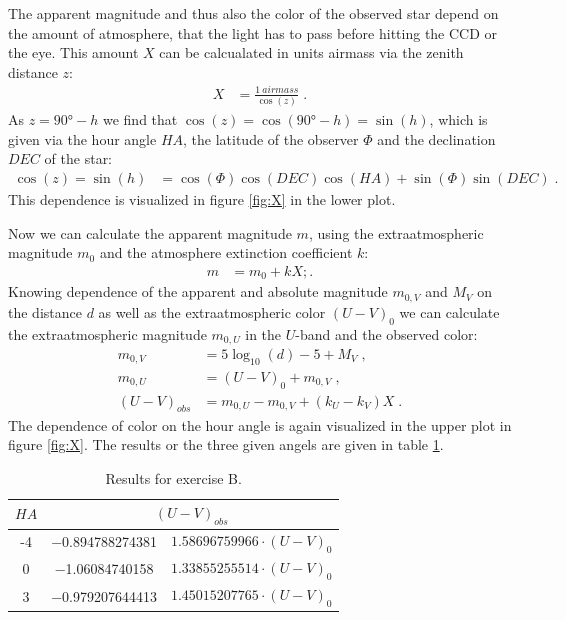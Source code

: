 \documentclass[11pt,a4paper,twoside]{article}
\begin{document}
The apparent magnitude and thus also the color of the observed star depend on
the amount of atmosphere, that the light has to pass before hitting the 
CCD or the eye. This amount $X$ can be calcualated in units airmass via the 
zenith distance $z$:
\begin{align}
    X &= \frac{\SI{1}{airmass}}{\cos(z)} \;.
\end{align}
As $z = \ang{90} - h$ we find that $\cos(z) = \cos(\ang{90} - h) = \sin(h)$,
which is given via the hour angle $HA$, the latitude of the observer $\Phi$
and the declination $DEC$ of the star:
\begin{align}
    \cos(z) = \sin(h) &= \cos(\Phi)\cos(DEC)\cos(HA) + \sin(\Phi)\sin(DEC) \;.
\end{align}
This dependence is visualized in figure \ref{fig:X} in the lower plot.

Now we can calculate the apparent magnitude $m$, using the extraatmospheric
magnitude $m_0$ and the atmosphere extinction coefficient $k$:
\begin{align}
    m &= m_0 + kX ;.
\end{align}
Knowing dependence of the apparent and absolute magnitude $m_{0,V}$ and $M_V$ 
on the distance $d$ as well as the extraatmospheric color $(U-V)_0$ we can 
calculate the extraatmospheric magnitude $m_{0,U}$ in the $U$-band and the
observed color:
\begin{align}
    m_{0,V} &= 5\log_{10}(d) - 5 + M_V \;,\\
    m_{0,U} &= (U-V)_0 + m_{0,V} \;,\\
    (U-V)_{obs} &= m_{0,U} - m_{0,V} + \left(k_U - k_V\right) X \;.
\end{align}
The dependence of color on the hour angle is again visualized in the upper plot
in figure \ref{fig:X}. The results or the three given angels are given in table
\ref{tab:col}.
\begin{table}[!h]
\centering
\begin{tabular}{ccc} \toprule
$HA$    & \multicolumn{2}{c}{$(U-V)_{obs}$} \\ \midrule
-4      & \num{-0.894788274381} & $\num{1.58696759966}\cdot(U-V)_0$  \\
0       & \num{-1.06084740158}  & $\num{1.33855255514}\cdot(U-V)_0$\\
3       & \num{-0.979207644413} & $\num{1.45015207765}\cdot(U-V)_0$\\ \bottomrule
\end{tabular}
\caption{Results for exercise B.}
\label{tab:col}
\end{table}
\end{document}
